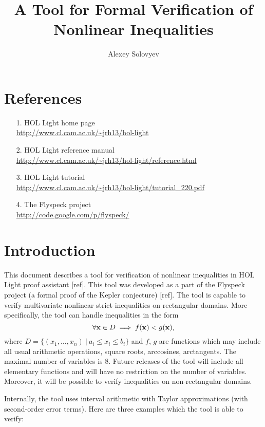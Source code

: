 \documentclass[a4paper]{article}
\title{A Tool for Formal Verification of Nonlinear Inequalities}
\author{Alexey Solovyev}
\begin{document}
\maketitle

\tableofcontents

\pagebreak
\section{References}
\begin{itemize}
\item[1.] HOL Light home page\\ 
	\url{http://www.cl.cam.ac.uk/~jrh13/hol-light}
\item[2.] HOL Light reference manual\\
	\url{http://www.cl.cam.ac.uk/~jrh13/hol-light/reference.html}
\item[3.] HOL Light tutorial\\
	\url{http://www.cl.cam.ac.uk/~jrh13/hol-light/tutorial_220.pdf}
\item[4.] The Flyspeck project\\
	\url{http://code.google.com/p/flyspeck/}
\end{itemize}

\section{Introduction}
This document describes a tool for verification of nonlinear inequalities in HOL Light proof assistant [ref]. This tool was developed as a part of the Flyspeck project (a formal proof of the Kepler conjecture) [ref]. The tool is capable to verify multivariate nonlinear strict inequalities on rectangular domains. More specifically, the tool can handle inequalities in the form
\[\forall {\bf x} \in D \implies f({\bf x}) < g({\bf x}),\]
where $D = \{(x_1, \ldots, x_n)\ |\ a_i \le x_i \le b_i\}$ and $f$, $g$ are functions which may include all usual arithmetic operations, square roots, arccosines, arctangents. The maximal number of variables is 8. Future releases of the tool will include all elementary functions and will have no restriction on the number of variables. Moreover, it will be possible to verify inequalities on non-rectangular domains.

Internally, the tool uses interval arithmetic with Taylor approximations (with second-order error terms). Here are three examples which the tool is able to verify:
\end{document}
